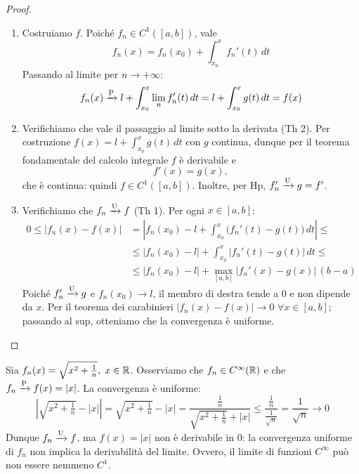 \begin{proof}
    \begin{enumerate}
        \item Costruiamo \(f\). Poiché \(f_{n}\in C^1([a,b])\), vale
        \[
        f_{n}(x) = f_{n}(x_{0}) + \int_{x_{0}}^{x} f_{n}'(t)\,dt
        \]
        Passando al limite per \(n\to+\infty\):
        \[
        f_{n}(x) \xrightarrow{\mathrm{P}} l + \int_{x_{0}}^{x} \lim_{n} f_{n}'(t)\,dt = l + \int_{x_{0}}^{x} g(t)\,dt = f(x)
        \]
        \item Verifichiamo che vale il passaggio al limite sotto la derivata (Th 2).
        Per costruzione \(f(x) = l + \int_{x_{0}}^{x} g(t)\,dt\) con \(g\) continua, dunque per il teorema fondamentale del calcolo integrale \(f\) è derivabile e
        \[
        f'(x) = g(x),
        \]
        che è continua: quindi \(f\in C^1([a,b])\). Inoltre, per Hp, \(f_{n}'\xrightarrow{\mathrm{U}} g = f'\).
        \item Verifichiamo che \(f_{n}\xrightarrow{\mathrm{U}} f\) (Th 1). Per ogni \(x\in[a,b]\):
        \begin{align*}
        0 \leq |f_{n}(x)-f(x)| &= \left| f_{n}(x_{0}) - l + \int_{x_{0}}^{x} \big(f_{n}'(t) - g(t)\big)\,dt \right| \leq \\
        &\leq |f_{n}(x_{0}) - l| + \int_{x_{0}}^{x} |f_{n}'(t) - g(t)|\,dt \leq \\
        &\leq |f_{n}(x_{0}) - l| + \max_{[a,b]} |f_{n}'(x) - g(x)|\,(b-a)
        \end{align*}
        Poiché \(f_{n}'\xrightarrow{\mathrm{U}}g\) e \(f_{n}(x_{0})\to l\), il membro di destra tende a \(0\) e non dipende da \(x\). Per il teorema dei carabinieri \(|f_{n}(x)-f(x)|\to 0\) \(\forall x\in[a,b]\); passando al sup, otteniamo che la convergenza è uniforme.
    \end{enumerate}
\end{proof}

\begin{example}
    Sia \(f_{n}(x)=\sqrt{x^{2}+\frac{1}{n}}, \; x\in\mathbb{R}\). Osserviamo che \(f_{n}\in C^{\infty}(\mathbb{R})\) e che \(f_{n}\xrightarrow{\mathrm{P}} f(x)=|x|\).
    La convergenza è uniforme:
    \[
    \left|\sqrt{x^{2}+\tfrac{1}{n}} - |x|\right| = \sqrt{x^{2}+\tfrac{1}{n}} - |x| = \frac{\frac{1}{n}}{\sqrt{x^{2}+\frac{1}{n}}+|x|} \leq \frac{\frac{1}{n}}{\frac{1}{\sqrt{n}}} = \frac{1}{\sqrt{n}} \to 0
    \]
    Dunque \(f_{n}\xrightarrow{\mathrm{U}} f\), ma \(f(x)=|x|\) non è derivabile in \(0\): la convergenza uniforme di \(f_{n}\) non implica la derivabilità del limite. Ovvero, il limite di funzioni \(C^{\infty}\) può non essere nemmeno \(C^1\).
\end{example}

